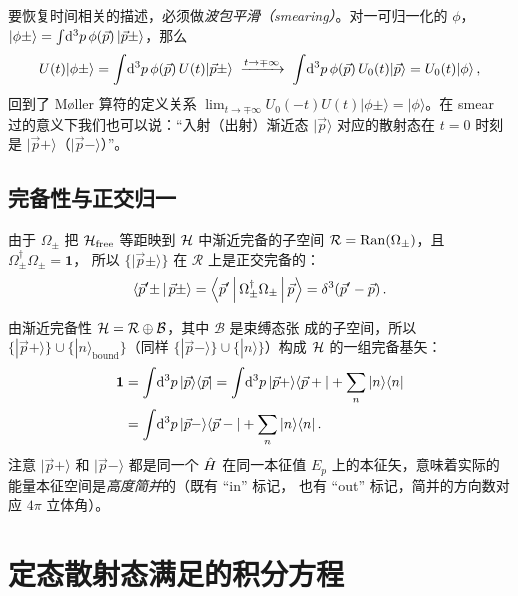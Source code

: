 要恢复时间相关的描述，必须做\emph{波包平滑（smearing）}。对一可归一化的 $\phi$，
$|\phi\pm\rangle = \int\!\mathrm{d}^3p\,\phi(\vec p)\,|\vec p\pm\rangle$，那么
\begin{equation}
  U(t)|\phi\pm\rangle
  = \int\!\mathrm{d}^3p\,\phi(\vec p)\,U(t)|\vec p\pm\rangle
  \;\xrightarrow{t\to\mp\infty}\;
  \int\!\mathrm{d}^3p\,\phi(\vec p)\,U_0(t)|\vec p\rangle
  = U_0(t)|\phi\rangle\,,
\end{equation}
回到了 M\o ller 算符的定义关系 $\lim_{t\to\mp\infty}U_0(-t)U(t)|\phi\pm\rangle =
|\phi\rangle$。在 smear 过的意义下我们也可以说：``入射（出射）渐近态
$|\vec p\rangle$ 对应的散射态在 $t=0$ 时刻是 $|\vec p+\rangle$（$|\vec p-\rangle$）''。

\subsection{完备性与正交归一}

由于 $\Omega_\pm$ 把 $\mathcal{H}_{\text{free}}$ 等距映到 $\mathcal{H}$ 中渐近完备的子空间
$\mathcal{R}=\operatorname{Ran}(\Omega_\pm)$，且 $\Omega_\pm^\dagger\Omega_\pm = \mathbf{1}$，
所以 $\{|\vec p\pm\rangle\}$ 在 $\mathcal{R}$ 上是正交完备的：
\begin{equation}
  \left\langle \vec p'\pm \,\middle|\, \vec p\pm \right\rangle
  = \left\langle \vec p' \,\middle|\, \Omega_\pm^\dagger\Omega_\pm \,\middle|\, \vec p \right\rangle
  = \delta^3(\vec p'-\vec p)\,.
  \label{eq:ppm-ortho}
\end{equation}

由渐近完备性 $\mathcal{H} = \mathcal{R}\oplus\mathcal{B}$，其中 $\mathcal{B}$ 是束缚态张
成的子空间，所以 $\{|\vec p+\rangle\}\cup\{|n\rangle_{\text{bound}}\}$（同样
$\{|\vec p-\rangle\}\cup\{|n\rangle\}$）构成 $\mathcal{H}$ 的一组完备基矢：
\begin{align}
  \mathbf{1}
  &= \int\!\mathrm{d}^3p\,|\vec p\rangle\langle\vec p|
   = \int\!\mathrm{d}^3p\,|\vec p+\rangle\langle\vec p+|+\sum_n |n\rangle\langle n|\nonumber\\
  &= \int\!\mathrm{d}^3p\,|\vec p-\rangle\langle\vec p-|+\sum_n |n\rangle\langle n|\,.
  \label{eq:completeness}
\end{align}
注意 $|\vec p+\rangle$ 和 $|\vec p-\rangle$ 都是同一个 $\hat{H}$ 在同一本征值
$E_p$ 上的本征矢，意味着实际的能量本征空间是\emph{高度简并}的（既有 ``in'' 标记，
也有 ``out'' 标记，简并的方向数对应 $4\pi$ 立体角）。

\section{定态散射态满足的积分方程}

